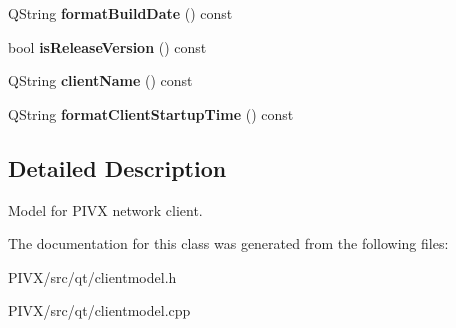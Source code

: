 \begin{DoxyCompactItemize}
\mbox{\label{class_client_model_a48d34d4832a0980e03cbc13e60338c37}} 
Q\+String {\bfseries format\+Build\+Date} () const
\item 
\mbox{\label{class_client_model_af8fdca28795abcf885ac4e78342ecccd}} 
bool {\bfseries is\+Release\+Version} () const
\item 
\mbox{\label{class_client_model_a3344257e3eccd1d123df143dd9f04a4c}} 
Q\+String {\bfseries client\+Name} () const
\item 
\mbox{\label{class_client_model_aae1793d38356a2e8040d9e7dc813b0c1}} 
Q\+String {\bfseries format\+Client\+Startup\+Time} () const
\end{DoxyCompactItemize}


\subsection{Detailed Description}
Model for P\+I\+VX network client. 

The documentation for this class was generated from the following files\+:\begin{DoxyCompactItemize}
\item 
P\+I\+V\+X/src/qt/clientmodel.\+h\item 
P\+I\+V\+X/src/qt/clientmodel.\+cpp\end{DoxyCompactItemize}
